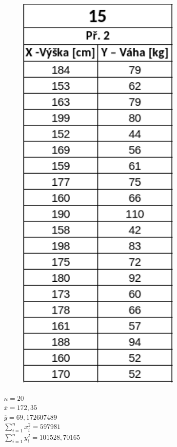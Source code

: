 \documentclass[11pt,a4paper]{article}
\begin{document}
\begin{figure}[H]
    \centering
    \includegraphics[scale=0.85]{img/2table.pdf}
\end{figure}

$ n = 20 $ \\

$ \overline{x} = 172,35 $ \\

$ \overline{y} = 69,172607489 $ \\

$ \sum\limits_{i=1}^{n} x_{i}^2 = 597981 $ \\

$ \sum\limits_{i=1}^{n} y_{i}^2 = 101528,70165 $ \\
\end{document}
